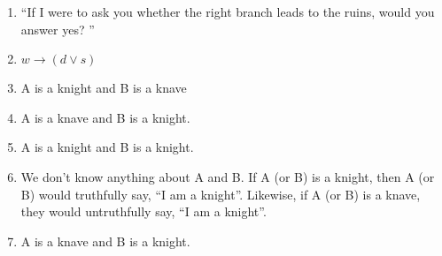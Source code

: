 \documentclass{sig-alternate-05-2015}
\begin{document}
\begin{enumerate}
\item \textquotedblleft If I were to ask you whether the right branch
leads to the ruins, would you answer yes? \textquotedblright
\item $w \rightarrow (d \vee s)$
\item A is a knight and B is a knave
\item A is a knave and B is a knight.
\item A is a knight and B is a knight.
\item We don’t know anything about A and B. If A (or B) is a knight, then A (or B) would
truthfully say, “I am a knight”. Likewise, if A (or B) is a knave, they would untruthfully
say, “I am a knight”.
\item A is a knave and B is a knight.
\end{enumerate}
\end{document}
